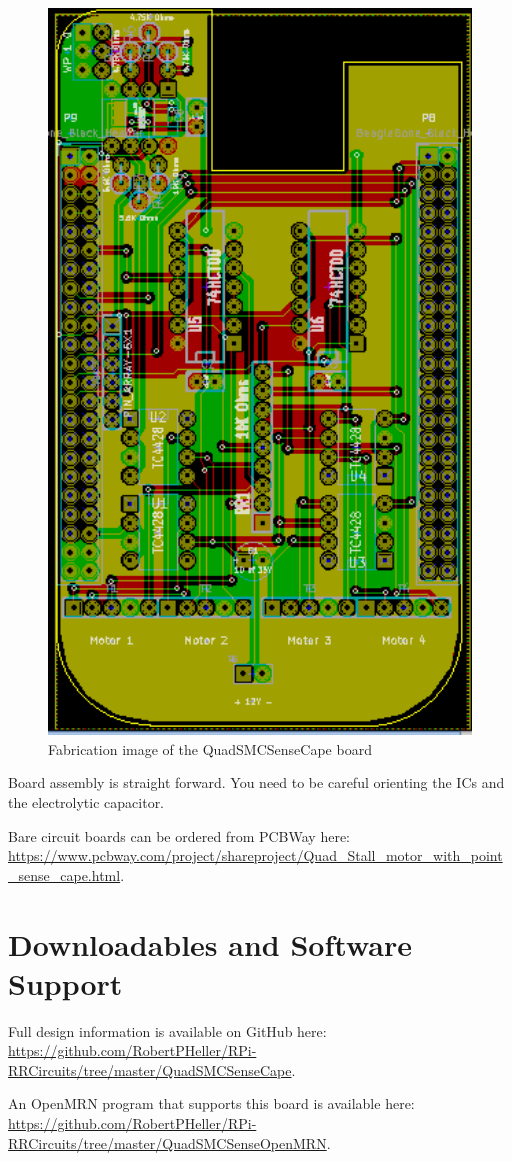 \begin{figure}[hbpt]\begin{centering}%
\includegraphics[width=5in]{QuadSMCSenseCape.png}
\caption{Fabrication image of the QuadSMCSenseCape board}
\end{centering}\end{figure}
Board assembly is straight forward. You need to be careful orienting the ICs
and the electrolytic capacitor.

Bare circuit boards can be ordered from PCBWay here: 
\url{https://www.pcbway.com/project/shareproject/Quad_Stall_motor_with_point_sense_cape.html}.

\section{Downloadables and Software Support}

Full design information is available on GitHub here:
\url{https://github.com/RobertPHeller/RPi-RRCircuits/tree/master/QuadSMCSenseCape}.

An OpenMRN program that supports this board is available here:
\url{https://github.com/RobertPHeller/RPi-RRCircuits/tree/master/QuadSMCSenseOpenMRN}.




